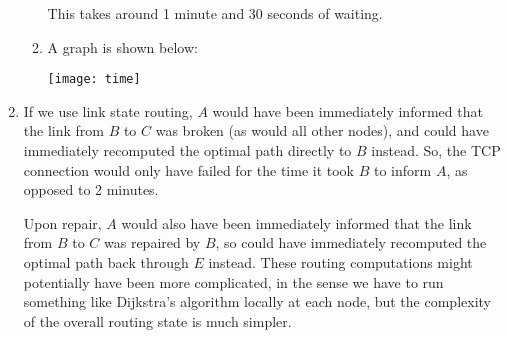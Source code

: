 \begin{enumerate}[label=(\alph*)]
\begin{enumerate}[label=(\roman*)]
        This takes around 1 minute and 30 seconds of waiting.

      \item

        A graph is shown below:

        \begin{minipage}{\textwidth}
          \centering
          \texttt{[image: time]}
        \end{minipage}
    \end{enumerate}

  \item
    If we use link state routing, $A$ would have been immediately informed that the link from $B$ to $C$ was broken (as would all other nodes), and could have immediately recomputed the optimal path directly to $B$ instead. So, the TCP connection would only have failed for the time it took $B$ to inform $A$, as opposed to 2 minutes.

    Upon repair, $A$ would also have been immediately informed that the link from $B$ to $C$ was repaired by $B$, so could have immediately recomputed the optimal path back through $E$ instead. These routing computations might potentially have been more complicated, in the sense we have to run something like Dijkstra's algorithm locally at each node, but the complexity of the overall routing state is much simpler.

        
\end{enumerate}

